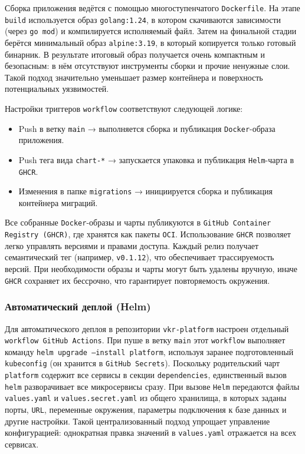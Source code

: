 Сборка приложения ведётся с помощью многоступенчатого \texttt{Dockerfile}. На этапе \texttt{build} используется образ \texttt{golang:1.24}, в котором скачиваются зависимости (через \texttt{go mod}) и компилируется исполняемый файл. Затем на финальной стадии берётся минимальный образ \texttt{alpine:3.19}, в который копируется только готовый бинарник. В результате итоговый образ получается очень компактным и безопасным: в нём отсутствуют инструменты сборки и прочие ненужные слои. Такой подход значительно уменьшает размер контейнера и поверхность потенциальных уязвимостей.

Настройки триггеров \texttt{workflow} соответствуют следующей логике:
\begin{itemize}
    \item Push в ветку \texttt{main} → выполняется сборка и публикация \texttt{Docker}-образа приложения.
    \item Push тега вида \texttt{chart-*} → запускается упаковка и публикация \texttt{Helm}-чарта в \texttt{GHCR}.
    \item Изменения в папке \texttt{migrations} → инициируется сборка и публикация контейнера миграций.
\end{itemize}
Все собранные \texttt{Docker}-образы и чарты публикуются в \texttt{GitHub Container Registry (GHCR)}, где хранятся как пакеты \texttt{OCI}. Использование \texttt{GHCR} позволяет легко управлять версиями и правами доступа. Каждый релиз получает семантический тег (например, \texttt{v0.1.12}), что обеспечивает трассируемость версий. При необходимости образы и чарты могут быть удалены вручную, иначе \texttt{GHCR} сохраняет их бессрочно, что гарантирует повторяемость окружения.

\subsubsection*{Автоматический деплой (Helm)}
Для автоматического деплоя в репозитории \texttt{vkr-platform} настроен отдельный \texttt{workflow GitHub Actions}. При пуше в ветку \texttt{main} этот \texttt{workflow} выполняет команду \texttt{helm upgrade --install platform}, используя заранее подготовленный \texttt{kubeconfig} (он хранится в \texttt{GitHub Secrets}). Поскольку родительский чарт \texttt{platform} содержит все сервисы в секции \texttt{dependencies}, единственный вызов \texttt{helm} разворачивает все микросервисы сразу. При вызове \texttt{Helm} передаются файлы \texttt{values.yaml} и \texttt{values.secret.yaml} из общего хранилища, в которых заданы порты, \texttt{URL}, переменные окружения, параметры подключения к базе данных и другие настройки. Такой централизованный подход упрощает управление конфигурацией: однократная правка значений в \texttt{values.yaml} отражается на всех сервисах.

